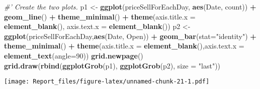 \documentclass[]{article}
\newenvironment{Shaded}{\begin{snugshade}}{\end{snugshade}}
\newcommand{\KeywordTok}[1]{\textcolor[rgb]{0.13,0.29,0.53}{\textbf{#1}}}
\newcommand{\DataTypeTok}[1]{\textcolor[rgb]{0.13,0.29,0.53}{#1}}
\newcommand{\DecValTok}[1]{\textcolor[rgb]{0.00,0.00,0.81}{#1}}
\newcommand{\StringTok}[1]{\textcolor[rgb]{0.31,0.60,0.02}{#1}}
\newcommand{\CommentTok}[1]{\textcolor[rgb]{0.56,0.35,0.01}{\textit{#1}}}
\newcommand{\OperatorTok}[1]{\textcolor[rgb]{0.81,0.36,0.00}{\textbf{#1}}}
\newcommand{\NormalTok}[1]{#1}
\begin{document}
\begin{Shaded}
\begin{Highlighting}[]
\CommentTok{#' Create the two plots.}
\NormalTok{p1 <-}\StringTok{ }\KeywordTok{ggplot}\NormalTok{(priceSellForEachDay, }\KeywordTok{aes}\NormalTok{(Date, count)) }\OperatorTok{+}\StringTok{ }\KeywordTok{geom_line}\NormalTok{() }\OperatorTok{+}\StringTok{ }\KeywordTok{theme_minimal}\NormalTok{() }\OperatorTok{+}\StringTok{ }
\StringTok{      }\KeywordTok{theme}\NormalTok{(}\DataTypeTok{axis.title.x =} \KeywordTok{element_blank}\NormalTok{(), }\DataTypeTok{axis.text.x =} \KeywordTok{element_blank}\NormalTok{())}
\NormalTok{p2 <-}\StringTok{ }\KeywordTok{ggplot}\NormalTok{(priceSellForEachDay,}\KeywordTok{aes}\NormalTok{(Date, Open)) }\OperatorTok{+}\StringTok{ }\KeywordTok{geom_bar}\NormalTok{(}\DataTypeTok{stat=}\StringTok{"identity"}\NormalTok{) }\OperatorTok{+}\StringTok{ }\KeywordTok{theme_minimal}\NormalTok{() }\OperatorTok{+}\StringTok{ }
\StringTok{      }\KeywordTok{theme}\NormalTok{(}\DataTypeTok{axis.title.x =} \KeywordTok{element_blank}\NormalTok{(),}\DataTypeTok{axis.text.x =} \KeywordTok{element_text}\NormalTok{(}\DataTypeTok{angle=}\DecValTok{90}\NormalTok{))}
\KeywordTok{grid.newpage}\NormalTok{()}
\KeywordTok{grid.draw}\NormalTok{(}\KeywordTok{rbind}\NormalTok{(}\KeywordTok{ggplotGrob}\NormalTok{(p1), }\KeywordTok{ggplotGrob}\NormalTok{(p2), }\DataTypeTok{size =} \StringTok{"last"}\NormalTok{))}
\end{Highlighting}
\end{Shaded}

\texttt{[image: Report\_files/figure-latex/unnamed-chunk-21-1.pdf]}
\end{document}
